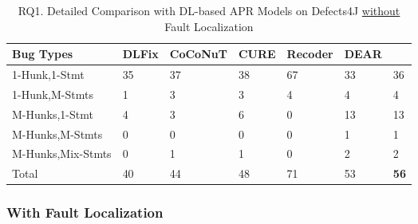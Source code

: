 \begin{table}
	\caption{RQ1. Detailed Comparison with DL-based APR Models on Defects4J \underline{without} Fault Localization}
	\vspace{-7pt}
	\begin{center}
	  \small
          \tabcolsep 2pt
		\renewcommand{\arraystretch}{1} 
\begin{tabular}{p{2.5cm}<{\centering}|p{0.8cm}<{\centering}|p{1.2cm}<{\centering}|p{0.7cm}<{\centering}|p{1cm}<{\centering}|p{0.9cm}<{\centering}|p{0.8cm}}
			\hline
			Bug Types & DLFix& CoCoNuT & CURE & Recoder & DEAR & {\tool}\\\hline
			
			1-Hunk,1-Stmt  & 35 & 37 & 38 & 67 & 33 & 36\\
			1-Hunk,M-Stmts  & 1 &3 & 3 & 4 & 4 & 4\\ 
			M-Hunks,1-Stmt  & 4 &3 & 6 & 0 & 13 & 13 \\
			M-Hunks,M-Stmts  & 0 &0 & 0 & 0 & 1 & 1\\
			M-Hunks,Mix-Stmts  & 0 & 1 & 1 & 0 & 2 & 2\\\hline
			Total & 40 & 44 & 48 & 71 & 53 & {\bf 56}\\
			\hline
		\end{tabular}
		\label{multi:tab}
	\end{center}
	\vspace{-4pt} %
\end{table}



\subsubsection{{\bf With Fault Localization}}

